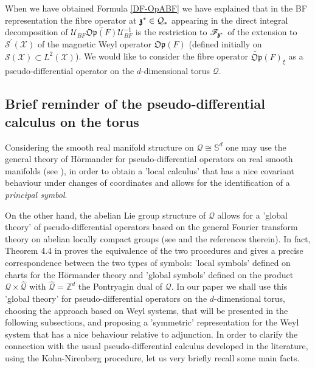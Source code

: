 \documentclass[12pt]{article}
\theoremstyle{definition}
\def\Zd{\mathbb{Z}^d}
\def\Op{\mathfrak{Op}}
\def\X{\mathcal X}
\def\U{\mathcal{U}}
\def\T{\mathcal{Q}}
\def\bz{\mathfrak{z}\hspace*{-4pt}\mathfrak{z}}
\def\Sd{\mathbb{S}^d}
\numberwithin{equation}{section}
\begin{document}
When we have obtained Formula \eqref{DF-OpABF} we have explained that in the BF representation the fibre operator at $\bz^*\in\T_*$ appearing  in the direct integral decomposition of $\U_{BF}\overline{\Op(F)}\U_{BF}^{-1}$ is the restriction to $\mathscr{F}_{\bz^*}$ of the extension to $\mathscr{S}^\prime(\X)$ of the magnetic Weyl operator $\Op(F)$ 
(defined initially on $\mathscr{S}(\X)\subset{L}^2(\X)$). We would like to consider the fibre operator $\widetilde{\Op}(F)_\xi$ as a pseudo-differential operator on the $d$-dimensional torus $\T$. 


\subsection{Brief reminder of the  pseudo-differential calculus on the torus}

Considering the smooth real manifold structure on $\T\cong\Sd$ one may use the general theory of H\"{o}rmander for pseudo-differential operators on real smooth manifolds (see \cite{Ho-3}), in order to obtain a 'local calculus' that has a nice covariant behaviour under  changes of coordinates and allows for the identification of a \textit{principal symbol}. 

On the other hand, the abelian Lie group structure of $\T$ allows for a 'global theory' of pseudo-differential operators based on the general Fourier transform theory on abelian locally compact groups (see \cite{Fo-AHA, McL-91, RT-06, RT-10} and the references therein). In fact, Theorem 4.4 in \cite{McL-91} proves the equivalence of the two procedures and gives a precise correspondence between the two types of symbols: 'local symbols' defined on charts for the H\"{o}rmander theory and 'global symbols' defined on the product $\T\times\widehat{\T}$ with $\widehat{\T}=\Zd$ the Pontryagin dual of $\T$.
In our paper we shall use this 'global theory' for pseudo-differential operators on the $d$-dimensional torus, choosing the approach based on Weyl systems, that will be  presented in the following subsections, and proposing a 'symmetric' representation for the Weyl system that has a nice behaviour relative to adjunction. In order to clarify the connection with the usual pseudo-differential calculus developed in the literature, using the Kohn-Nirenberg procedure, let us very briefly recall some main facts. 
\end{document}
